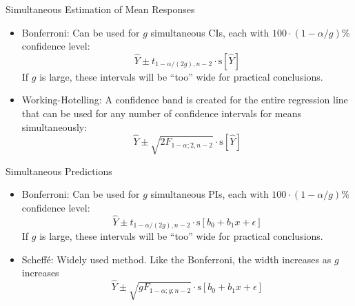 \documentclass{beamer}
\newcommand{\s}{\mathrm{s}}
\begin{document}
\begin{frame}{Simultaneous Estimation of Mean Responses}
\begin{itemize}
    \item Bonferroni: Can be used for $g$ simultaneous CIs, each with $100\cdot(1-\alpha/g)\%$ confidence level:
    $$
    \hat{Y}\pm t_{1-\alpha/(2g),n-2}\cdot\s[\hat{Y}]
    $$
    \pause If $g$ is large, these intervals will be ``too'' wide for practical conclusions.
    \item\pause Working-Hotelling: A confidence band is created for the entire regression line that can be used for any number of confidence intervals for means simultaneously:
    $$
    \hat{Y}\pm\sqrt{2F_{1-\alpha;2,n-2}}\cdot\s[\hat{Y}]
    $$
\end{itemize}    
\end{frame}

\begin{frame}{Simultaneous Predictions}
\begin{itemize}
    \item Bonferroni: Can be used for $g$ simultaneous PIs, each with $100\cdot(1-\alpha/g)\%$ confidence level:
    $$
    \hat{Y}\pm t_{1-\alpha/(2g),n-2}\cdot\s[b_0+b_1x+\epsilon]
    $$
    \pause If $g$ is large, these intervals will be ``too'' wide for practical conclusions.
    \item Scheff\'e: Widely used method. Like the Bonferroni, the width increases as $g$ increases
    $$
    \hat{Y}\pm\sqrt{g F_{1-\alpha;g;n-2}}\cdot\s[b_0+b_1x+\epsilon]
    $$
\end{itemize}    
\end{frame}
\end{document}
